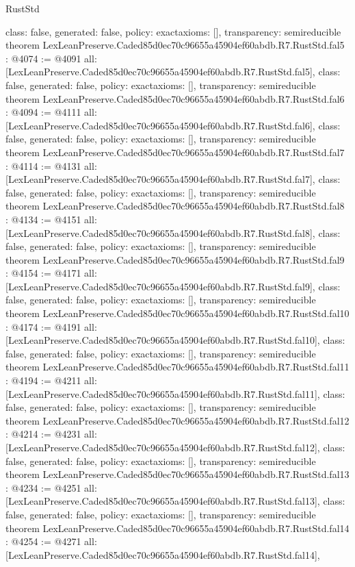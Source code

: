 \begin{lexlean}{RustStd}
\begin{coremodule}
{  class: false,
  generated: false,
  policy: exact{axioms: []},
  transparency: semireducible
}
theorem LexLeanPreserve.Caded85d0ec70c96655a45904ef60abdb.R7.RustStd.fal5 : @4074 := @4091 {
  all: [LexLeanPreserve.Caded85d0ec70c96655a45904ef60abdb.R7.RustStd.fal5],
  class: false,
  generated: false,
  policy: exact{axioms: []},
  transparency: semireducible
}
theorem LexLeanPreserve.Caded85d0ec70c96655a45904ef60abdb.R7.RustStd.fal6 : @4094 := @4111 {
  all: [LexLeanPreserve.Caded85d0ec70c96655a45904ef60abdb.R7.RustStd.fal6],
  class: false,
  generated: false,
  policy: exact{axioms: []},
  transparency: semireducible
}
theorem LexLeanPreserve.Caded85d0ec70c96655a45904ef60abdb.R7.RustStd.fal7 : @4114 := @4131 {
  all: [LexLeanPreserve.Caded85d0ec70c96655a45904ef60abdb.R7.RustStd.fal7],
  class: false,
  generated: false,
  policy: exact{axioms: []},
  transparency: semireducible
}
theorem LexLeanPreserve.Caded85d0ec70c96655a45904ef60abdb.R7.RustStd.fal8 : @4134 := @4151 {
  all: [LexLeanPreserve.Caded85d0ec70c96655a45904ef60abdb.R7.RustStd.fal8],
  class: false,
  generated: false,
  policy: exact{axioms: []},
  transparency: semireducible
}
theorem LexLeanPreserve.Caded85d0ec70c96655a45904ef60abdb.R7.RustStd.fal9 : @4154 := @4171 {
  all: [LexLeanPreserve.Caded85d0ec70c96655a45904ef60abdb.R7.RustStd.fal9],
  class: false,
  generated: false,
  policy: exact{axioms: []},
  transparency: semireducible
}
theorem LexLeanPreserve.Caded85d0ec70c96655a45904ef60abdb.R7.RustStd.fal10 : @4174 := @4191 {
  all: [LexLeanPreserve.Caded85d0ec70c96655a45904ef60abdb.R7.RustStd.fal10],
  class: false,
  generated: false,
  policy: exact{axioms: []},
  transparency: semireducible
}
theorem LexLeanPreserve.Caded85d0ec70c96655a45904ef60abdb.R7.RustStd.fal11 : @4194 := @4211 {
  all: [LexLeanPreserve.Caded85d0ec70c96655a45904ef60abdb.R7.RustStd.fal11],
  class: false,
  generated: false,
  policy: exact{axioms: []},
  transparency: semireducible
}
theorem LexLeanPreserve.Caded85d0ec70c96655a45904ef60abdb.R7.RustStd.fal12 : @4214 := @4231 {
  all: [LexLeanPreserve.Caded85d0ec70c96655a45904ef60abdb.R7.RustStd.fal12],
  class: false,
  generated: false,
  policy: exact{axioms: []},
  transparency: semireducible
}
theorem LexLeanPreserve.Caded85d0ec70c96655a45904ef60abdb.R7.RustStd.fal13 : @4234 := @4251 {
  all: [LexLeanPreserve.Caded85d0ec70c96655a45904ef60abdb.R7.RustStd.fal13],
  class: false,
  generated: false,
  policy: exact{axioms: []},
  transparency: semireducible
}
theorem LexLeanPreserve.Caded85d0ec70c96655a45904ef60abdb.R7.RustStd.fal14 : @4254 := @4271 {
  all: [LexLeanPreserve.Caded85d0ec70c96655a45904ef60abdb.R7.RustStd.fal14],
}
\end{coremodule}
\end{lexlean}
